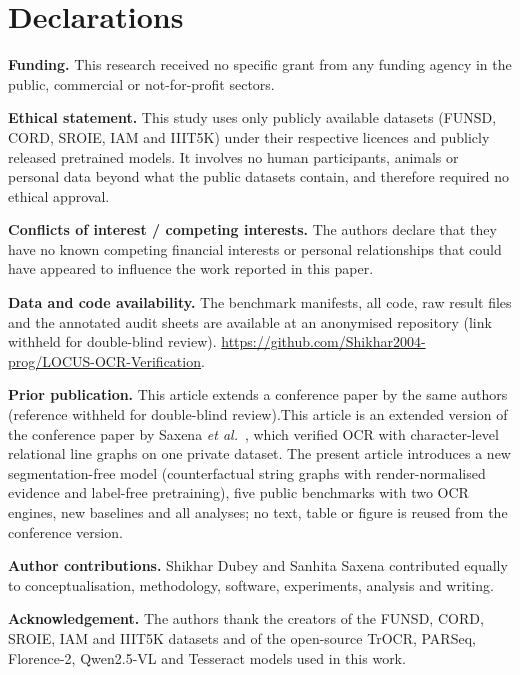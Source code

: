 \section*{Declarations}
\textbf{Funding.} This research received no specific grant from any funding agency in the public, commercial or
not-for-profit sectors.

\textbf{Ethical statement.} This study uses only publicly available datasets (FUNSD, CORD, SROIE, IAM and IIIT5K) under
their respective licences and publicly released pretrained models. It involves no human participants, animals or
personal data beyond what the public datasets contain, and therefore required no ethical approval.

\textbf{Conflicts of interest / competing interests.} The authors declare that they have no known competing financial
interests or personal relationships that could have appeared to influence the work reported in this paper.

\textbf{Data and code availability.} The benchmark manifests, all code, raw result files and the annotated audit
sheets are available at
\ifanon an anonymised repository (link withheld for double-blind review).\else
\url{https://github.com/Shikhar2004-prog/LOCUS-OCR-Verification}.\fi

\textbf{Prior publication.} \ifanon This article extends a conference paper by the same authors (reference withheld
for double-blind review).\else This article is an extended version of the conference paper by Saxena \emph{et al.}~\cite{saxena2026reading}, which verified OCR with character-level relational line graphs on one private dataset.
The present article introduces a new segmentation-free model (counterfactual string graphs with render-normalised
evidence and label-free pretraining), five public benchmarks with two OCR engines, new baselines and all analyses;
no text, table or figure is reused from the conference version.\fi

\ifanon\else
\textbf{Author contributions.} Shikhar Dubey and Sanhita Saxena contributed equally to conceptualisation, methodology,
software, experiments, analysis and writing.
\fi

\textbf{Acknowledgement.} The authors thank the creators of the FUNSD, CORD, SROIE, IAM and IIIT5K datasets and of the
open-source TrOCR, PARSeq, Florence-2, Qwen2.5-VL and Tesseract models used in this work.
